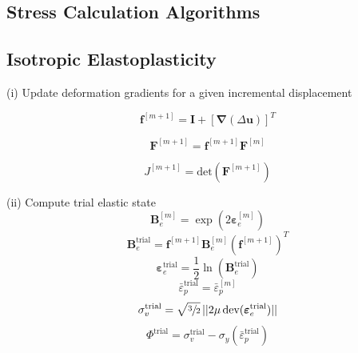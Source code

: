 \documentclass[sn-mathphys,Numbered]{sn-jnl}%
\newcommand{\bb}{\boldsymbol}
\begin{document}
\begin{appendices}

\section{Stress Calculation Algorithms} \label{app:stressCalcAlg}

\subsection{Isotropic Elastoplasticity}
 
\begin{algorithm}[htb] \label{alg:stressAlg} \footnotesize
\SetAlgoLined
(i) Update deformation gradients for a given incremental displacement

\begin{equation}
  \bb{f}^{[m+1]} = \bb{I} + \left[ \bb{\nabla}(\Delta\textbf{u}) \right]^T \nonumber
\end{equation}

\begin{equation}
  \bb{F}^{[m+1]} = \bb{f}^{[m+1]} \bb{F}^{[m]}  \nonumber
\end{equation}

\begin{equation}
  J^{[m+1]} = \text{det} \left( \bb{F}^{[m+1]} \right) \nonumber
\end{equation}

(ii) Compute trial elastic state
\begin{equation}
\bb{B}_{e}^{[m]} = \exp\left({2\boldsymbol{\varepsilon}_{e}^{[m]}}\right) \nonumber
\end{equation}
\begin{equation}
\bb{B}_{e}^{\text{trial}} = \bb{f}^{[m+1]}  \bb{B}_{e}^{[m]} \left(\bb{f}^{[m+1]} \right)^{T}\nonumber
\end{equation}
\begin{equation}
\boldsymbol{\varepsilon}_{e}^{\text{trial}} = \frac{1}{2} \ln\left(\textbf{B}_{e}^{\text{trial}} \right) \nonumber
\end{equation}
\begin{equation}
\bar{\varepsilon}^{\text{trial}}_p = \bar{\varepsilon}^{[m]}_p \nonumber
\end{equation}
\begin{equation}
\sigma_{v}^{\text{trial}} = \sqrt{\sfrac{3}{2}} \, || 2 \mu \, \text{dev}(\boldsymbol{\varepsilon}_{e}^{\text{trial}})|| \nonumber
\end{equation}
\begin{equation}
\Phi^{\text{trial}} =  \sigma_{v}^{\text{trial}} - \sigma_{y}(\bar{\varepsilon}^{\text{trial}}_p) \nonumber 
\end{equation}


\end{algorithm}
\end{appendices}
\end{document}
